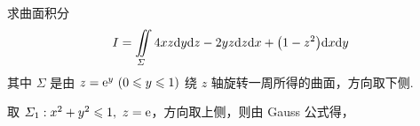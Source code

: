 \begin{example}
    求曲面积分 $$I=\iint\limits_\varSigma 4xz\dd y\dd z-2yz\dd z\dd x+\qty(1-z^2)\dd x\dd y$$
    其中 $\varSigma$ 是由 $z=\mathrm{e} ^y~ (0\leqslant y\leqslant 1)$ 绕 $z$ 轴旋转一周所得的曲面，方向取下侧.
\end{example}
\begin{solution}
    取 $\varSigma_1:x^2+y^2\leqslant 1,~z=\mathrm{e} $，方向取上侧，则由 Gauss 公式得，
\end{solution}


